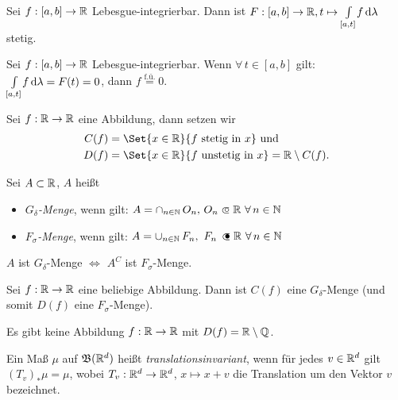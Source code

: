 \documentclass{cheat-sheet}
\newcommand{\Bor}{\mathfrak{B}} %
\newcommand{\fue}{\overset{\text{f.ü.}}} %
\theoremstyle{definition}
\begin{document}
\begin{satz}
  Sei $f : [a, b] \to \mathbb{R}$ Lebesgue-integrierbar. Dann ist $F : [a, b] \to \mathbb{R}, t \mapsto {\textstyle \int\limits_{[a, t]}^{}} f \,\mathrm{d} \lambda$ stetig.
\end{satz}

\begin{satz}
  Sei $f : [a, b] \to \mathbb{R}$ Lebesgue-integrierbar. Wenn $\forall \, t \in [a, b]$ gilt: ${\textstyle \int\limits_{[a, t]}^{}} f \,\mathrm{d} \lambda = F(t) = 0$, dann $f \fue= 0$.
\end{satz}

\begin{nota}
  Sei $f : \mathbb{R} \to \mathbb{R}$ eine Abbildung, dann setzen wir
  \begin{align*}
    C(f) &= \Set{ x \in \R }{ f \text{ stetig in } x } \text{ und}\\
    D(f) &= \Set{ x \in \R }{ f \text{ unstetig in } x } = \R \setminus C(f).
  \end{align*}
\end{nota}

\begin{defn}
  Sei $A \subset \mathbb{R}$, $A$ heißt
  \begin{itemize}
    \item \emph{$G_{\delta}$-Menge}, wenn gilt: $A = \cap_{n \in \N}\,O_n, \, O_n \opn \R\ \forall\,n \in \N$
    \item \emph{$F_{\sigma}$-Menge}, wenn gilt: $A = \cup_{n \in \N}\,F_n, \,\, F_n \, \cls \R\ \forall\,n \in \N$
  \end{itemize}
\end{defn}

\begin{bem}
  $A $ ist $G_\delta$-Menge $\iff$ $A^C$ ist $F_\sigma$-Menge.
\end{bem}

\begin{satz}[Young]
  Sei $f : \mathbb{R} \to \mathbb{R}$ eine beliebige Abbildung. Dann ist $C(f)$ eine $G_\delta$-Menge (und somit $D(f)$ eine $F_\sigma$-Menge).
\end{satz}

\begin{kor}
  Es gibt keine Abbildung $f : \mathbb{R} \to \mathbb{R}$ mit $D(f) = \mathbb{R} \setminus \mathbb{Q}$.
\end{kor}

\begin{defn}
  Ein Maß $\mu$ auf $\Bor(\R^d)$ heißt \emph{translationsinvariant}, wenn für jedes $v \in \mathbb{R}^d$ gilt $(T_v)_* \mu = \mu$, wobei $T_v : \mathbb{R}^d \to \mathbb{R}^d$, $x \mapsto x + v$ die Translation um den Vektor $v$ bezeichnet.
\end{defn}
\end{document}

